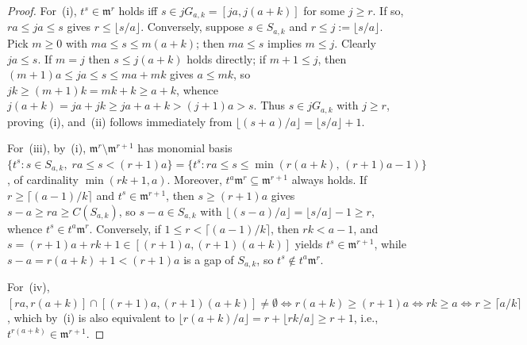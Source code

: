\documentclass[11pt]{amsart}
\theoremstyle{definition}
\theoremstyle{remark}
\newcommand{\mm}{\mathfrak{m}}
\begin{document}
\begin{proof}
For~(i), $t^s \in \mm^r$ holds iff $s \in j G_{a,k} = [ja, j(a+k)]$ for some $j \ge r$. If so, $ra \le ja \le s$ gives $r \le \lfloor s/a \rfloor$. Conversely, suppose $s \in S_{a,k}$ and $r \le j := \lfloor s/a \rfloor$. Pick $m \ge 0$ with $ma \le s \le m(a+k)$; then $ma \le s$ implies $m \le j$. Clearly $ja \le s$. If $m = j$ then $s \le j(a+k)$ holds directly; if $m + 1 \le j$, then $(m+1)a \le ja \le s \le ma + mk$ gives $a \le mk$, so $jk \ge (m+1)k = mk + k \ge a + k$, whence $j(a+k) = ja + jk \ge ja + a + k > (j+1)a > s$. Thus $s \in j G_{a,k}$ with $j \ge r$, proving~(i), and~(ii) follows immediately from $\lfloor (s+a)/a \rfloor = \lfloor s/a \rfloor + 1$.

For~(iii), by~(i), $\mm^r \setminus \mm^{r+1}$ has monomial basis $\{t^s : s \in S_{a,k},\; ra \le s < (r+1)a\} = \{t^s : ra \le s \le \min(r(a+k),\, (r+1)a - 1)\}$, of cardinality $\min(rk + 1, a)$. Moreover, $t^a \mm^r \subseteq \mm^{r+1}$ always holds. If $r \ge \lceil (a-1)/k \rceil$ and $t^s \in \mm^{r+1}$, then $s \ge (r+1)a$ gives $s - a \ge ra \ge C(S_{a,k})$, so $s - a \in S_{a,k}$ with $\lfloor (s-a)/a \rfloor = \lfloor s/a \rfloor - 1 \ge r$, whence $t^s \in t^a \mm^r$. Conversely, if $1 \le r < \lceil (a-1)/k \rceil$, then $rk < a - 1$, and $s = (r+1)a + rk + 1 \in [(r+1)a, (r+1)(a+k)]$ yields $t^s \in \mm^{r+1}$, while $s - a = r(a+k) + 1 < (r+1)a$ is a gap of $S_{a,k}$, so $t^s \notin t^a \mm^r$.

For~(iv), $[ra, r(a+k)] \cap [(r+1)a, (r+1)(a+k)] \ne \emptyset \iff r(a+k) \ge (r+1)a \iff rk \ge a \iff r \ge \lceil a/k \rceil$, which by~(i) is also equivalent to $\lfloor r(a+k)/a \rfloor = r + \lfloor rk/a \rfloor \ge r + 1$, i.e., $t^{r(a+k)} \in \mm^{r+1}$.
\end{proof}
\end{document}
